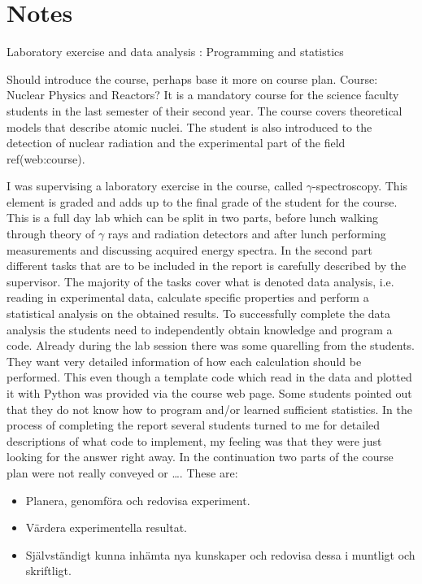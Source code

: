 \documentclass[]{article}
\begin{document}
\section{Notes}
Laboratory exercise and data analysis : Programming and statistics

Should introduce the course, perhaps base it more on course plan.
Course: Nuclear Physics and Reactors?
It is a mandatory course for the science faculty students in the last semester of their second year.
The course covers theoretical models that describe atomic nuclei.
The student is also introduced to the detection of nuclear radiation and the experimental part of the field ref(web:course).

I was supervising a laboratory exercise in the course, called $\gamma$-spectroscopy.
This element is graded and adds up to the final grade of the student for the course.
This is a full day lab which can be split in two parts, before lunch walking through theory of $\gamma$ rays and radiation detectors and after lunch performing measurements and discussing acquired energy spectra.
In the second part different tasks that are to be included in the report is carefully described by the supervisor.
The majority of the tasks cover what is denoted data analysis, i.e. reading in experimental data, calculate specific properties and perform a statistical analysis on the obtained results.
To successfully complete the data analysis the students need to independently obtain knowledge and program a code.
Already during the lab session there was some quarelling from the students.
They want very detailed information of how each calculation should be performed.
This even though a template code which read in the data and plotted it with Python was provided via the course web page.
Some students pointed out that they do not know how to program and/or learned sufficient statistics.
In the process of completing the report several students turned to me for detailed descriptions of what code to implement, my feeling was that they were just looking for the answer right away.
In the continuation two parts of the course plan were not really conveyed or \dots. These are:
\begin{itemize}
  \item Planera, genomföra och redovisa experiment.
  \item Värdera experimentella resultat.
  \item Självständigt kunna inhämta nya kunskaper och redovisa dessa i muntligt och skriftligt.
\end{itemize}
\end{document}

